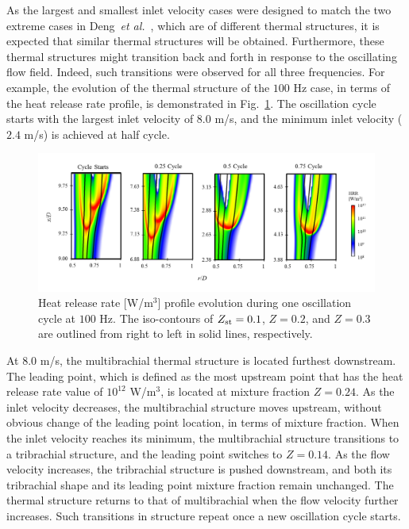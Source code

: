 \documentclass[review,3p,times]{elsarticle}
\begin{document}
As the largest and smallest inlet velocity cases were designed to match the two extreme cases in Deng~\emph{et al.}~\cite{deng15b}, which are of different thermal structures, it is expected that similar thermal structures will be obtained.  Furthermore, these thermal structures might transition back and forth in response to the oscillating flow field.  Indeed, such transitions were observed for all three frequencies.  For example, the evolution of the thermal structure of the $100$ Hz case, in terms of the heat release rate profile, is demonstrated in Fig.~\ref{fig:HRR_100Hz}.  The oscillation cycle starts with the largest inlet velocity of $8.0$ m/s, and the minimum inlet velocity ($2.4$ m/s) is achieved at half cycle.  

\begin{figure}[t]
  \centering
  \scriptsize
  \vspace{-0.10in}
  \includegraphics[trim=6.5mm 7.5mm 7mm 8mm, clip=true, width=1.0\textwidth]{HRR_100Hz.png}
  \normalsize
  \vspace{-0.2in}
  \caption{Heat release rate [W/m$^3$] profile evolution during one oscillation cycle at $100$ Hz.  The iso-contours of $Z_{\rm st} = 0.1$, $Z = 0.2$, and $Z = 0.3$ are outlined from right to left in solid lines, respectively.}
  \label{fig:HRR_100Hz}
\end{figure}


At $8.0$ m/s, the multibrachial thermal structure is located furthest downstream.  The leading point, which is defined as the most upstream point that has the heat release rate value of $10^{12}$ W/m$^3$, is located at mixture fraction $Z = 0.24$.  As the inlet velocity decreases, the multibrachial structure moves upstream, without obvious change of the leading point location, in terms of mixture fraction.  When the inlet velocity reaches its minimum, the multibrachial structure transitions to a tribrachial structure, and the leading point switches to $Z = 0.14$.  As the flow velocity increases, the tribrachial structure is pushed downstream, and both its tribrachial shape and its leading point mixture fraction remain unchanged.  The thermal structure returns to that of multibrachial when the flow velocity further increases.  Such transitions in structure repeat once a new oscillation cycle starts.
\end{document}
